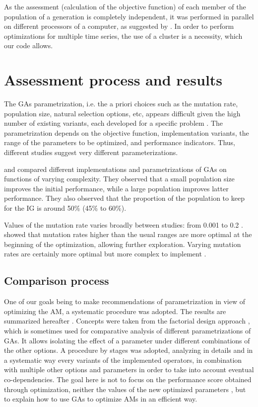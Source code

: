 \documentclass{ametsoc}
\begin{document}
As the assessment (calculation of the objective function) of each member of the population of a generation is completely independent, it was performed in parallel on different processors of a computer, as suggested by \citet{Alliot2005}. In order to perform optimizations for multiple time series, the use of a cluster is a necessity, which our code allows.


\section{Assessment process and results}
\label{sec:assessment}

The GAs parametrization, i.e. the a priori choices such as the mutation rate, population size, natural selection options, etc, appears difficult given the high number of existing variants, each developed for a specific problem \citep{Haupt2004, Costa2007a}. The parametrization depends on the objective function, implementation variants, the range of the parameters to be optimized, and performance indicators. Thus, different studies suggest very different parameterizations.

\citet{DeJong1975a} and \citet{Grefenstette1986} compared different implementations and parametrizations of GAs on functions of varying complexity. They observed that a small population size improves the initial performance, while a large population improves latter performance. They also observed that the proportion of the population to keep for the IG is around 50\% (45\% to 60\%).

Values of the mutation rate varies broadly between studies: from 0.001 \citep{DeJong1975a} to 0.2 \citep{Haupt2004}. \citet{Back1996b} showed that mutation rates higher than the usual ranges are more optimal at the beginning of the optimization, allowing further exploration. Varying mutation rates are certainly more optimal but more complex to implement \citep{Back1996a, Back1996b}.


\subsection{Comparison process}

One of our goals being to make recommendations of parametrization in view of optimizing the AM, a systematic procedure was adopted. The results are summarized hereafter \citep[see][for the details]{Horton2012a}. Concepts were taken from the factorial design approach \citep[see eg.][]{Costa2005a,Costa2007a,Mariano2010a}, which is sometimes used for comparative analysis of different parametrizations of GAs. It allows isolating the effect of a parameter under different combinations of the other options. A procedure by stages was adopted, analyzing in details and in a systematic way every variants of the implemented operators, in combination with multiple other options and parameters in order to take into account eventual co-dependencies. The goal here is not to focus on the performance score obtained through optimization, neither the values of the new optimized parameters \citep[covered in][]{Horton2016b}, but to explain how to use GAs to optimize AMs in an efficient way.
\end{document}
